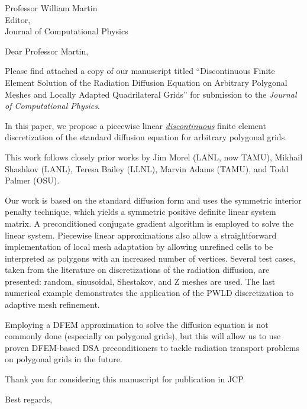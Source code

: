 \begin{letter}{Professor William Martin\\
    Editor,\\
    Journal of Computational Physics}
\date{\today}

\opening{Dear Professor Martin,}
         \vspace{0.25cm}

Please find attached a copy of our manuscript titled ``Discontinuous Finite Element Solution of the Radiation Diffusion Equation on Arbitrary Polygonal Meshes and Locally Adapted Quadrilateral Grids'' for submission to the {\em Journal of Computational Physics}. 

In this paper, we propose a piecewise linear \underline{\it discontinuous} finite element discretization of the standard diffusion equation for arbitrary polygonal grids. 


This work follows closely prior works by Jim Morel (LANL, now TAMU), Mikhail Shashkov (LANL), Teresa Bailey (LLNL), Marvin Adams (TAMU), and Todd Palmer (OSU).

Our work is based on the standard diffusion form and uses the symmetric interior penalty technique, which yields a 
symmetric positive definite linear system matrix. A preconditioned conjugate gradient algorithm is employed to solve the linear system. 
Piecewise linear approximations also allow a straightforward implementation of local mesh adaptation by allowing unrefined cells to
be interpreted as polygons with an increased number of vertices.
Several test cases, taken from the literature on discretizations of the radiation diffusion, are presented: random, sinusoidal, Shestakov, 
and Z meshes are used. The last numerical example demonstrates the application of the PWLD discretization to adaptive mesh refinement.

Employing a DFEM approximation to solve the diffusion equation is not commonly done (especially on polygonal grids), but this will allow us to use proven DFEM-based DSA preconditioners to tackle radiation transport problems on polygonal grids in the future.



Thank you for considering this manuscript for publication in JCP.

\vspace{-0.25cm}



\closing{Best regards, }

\end{letter}


